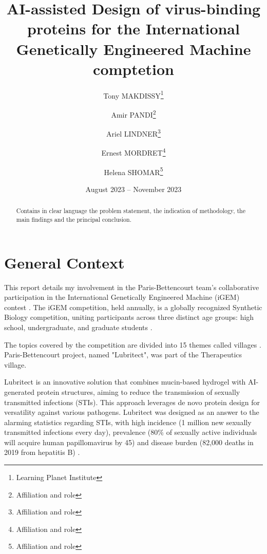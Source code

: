 \documentclass[11pt,a4paper]{article}
\begin{document}
\title{AI-assisted Design of virus-binding proteins for the International Genetically Engineered Machine comptetion}
\author{Tony MAKDISSY\thanks{Learning Planet Institute} \and 
Amir PANDI\thanks{Affiliation and role} \and 
Ariel LINDNER\thanks{Affiliation and role} \and
Ernest MORDRET\thanks{Affiliation and role} \and
Helena SHOMAR\thanks{Affiliation and role}}




\date{August 2023 -- November 2023}
\maketitle

\begin{abstract}
    Contains in clear language the problem statement, the indication of methodology, the main findings and the principal conclusion.
\end{abstract}

\section{General Context}

This report details my involvement in the Paris-Bettencourt team's 
collaborative participation in the International Genetically Engineered 
Machine (iGEM) contest \cite{igem_main}. The iGEM competition, held annually, 
is a globally recognized Synthetic Biology competition, uniting 
participants across three distinct age groups: high school, undergraduate, 
and graduate students \cite{igem_description}.

The topics covered by the competition are divided into 15 themes called villages \cite{igem_villages}.
Paris-Bettencourt project, named "Lubritect", was part of the Therapeutics village.

Lubritect is an innovative solution that combines mucin-based hydrogel 
with AI-generated protein structures, aiming to reduce the transmission 
of sexually transmitted infections (STIs). This approach leverages de novo 
protein design for versatility against various pathogens. Lubritect was designed
as an answer to the alarming statistics regarding STIs, with high incidence 
(1 million new sexually transmitted infections every day), 
prevalence (80\% of sexually active individuals will acquire human papillomavirus by 45)
and disease burden (82,000 deaths in 2019 from hepatitis B) \cite{paris_bettencourt_project}.
\end{document}
